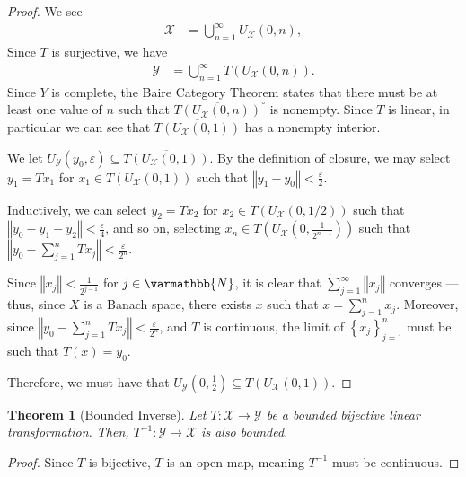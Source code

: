\documentclass[10pt]{extarticle}
\newcommand{\N}{\mathbb{N}}
\newcommand{\norm}[1]{\left\Vert #1\right\Vert}
\newcommand{\set}[1]{\left\{#1\right\}}
\newcommand{\ve}{\varepsilon}
\theoremstyle{plain}
\newtheorem*{theorem}{Theorem}
\theoremstyle{definition}
\theoremstyle{note}
\renewcommand*{\mathbb}[1]{\varmathbb{#1}}
\renewcommand{\newline}{\hfill\break}
\begin{document}
\begin{proof}
  We see
  \begin{align*}
    \mathcal{X} &= \bigcup_{n=1}^{\infty}U_{\mathcal{X}}(0,n),
  \end{align*}
  Since $T$ is surjective, we have
  \begin{align*}
    \mathcal{Y} &= \bigcup_{n=1}^{\infty}T\left(U_{\mathcal{X}}(0,n)\right).
  \end{align*}
  Since $Y$ is complete, the Baire Category Theorem states that there must be at least one value of $n$ such that $\overline{T\left(U_{\mathcal{X}}(0,n)\right)}^{\circ}$ is nonempty. Since $T$ is linear, in particular we can see that $\overline{T\left(U_{\mathcal{X}}(0,1)\right)}$ has a nonempty interior.\newline

  We let $U_{\mathcal{Y}}\left(y_0,\ve\right)\subseteq \overline{T\left(U_{\mathcal{X}}(0,1)\right)}$. By the definition of closure, we may select $y_1 = Tx_1$ for $x_1 \in T\left(U_{\mathcal{X}}(0,1)\right)$ such that $\norm{y_1 - y_0} < \frac{\ve}{2}$. \newline

  Inductively, we can select $y_2 = Tx_2$ for $x_2 \in T\left(U_{\mathcal{X}}(0,1/2)\right)$ such that $\norm{y_0 - y_1 - y_2} < \frac{\ve}{4}$, and so on, selecting $x_n\in T\left(U_{\mathcal{X}}\left(0,\frac{1}{2^{n-1}}\right)\right)$ such that $\norm{y_0 - \sum_{j=1}^{n}Tx_j} < \frac{\ve}{2^{n}}$.\newline

  Since $\norm{x_j} < \frac{1}{2^{j-1}}$ for $j\in \N$, it is clear that $\sum_{j=1}^{\infty}\norm{x_j}$ converges --- thus, since $X$ is a Banach space, there exists $x$ such that $x = \sum_{j=1}^{n}x_j$. Moreover, since $\norm{y_0 - \sum_{j=1}^{n}Tx_j} < \frac{\ve}{2^n}$, and $T$ is continuous, the limit of $\set{x_j}_{j=1}^{n}$ must be such that $T(x) = y_0$.\newline

  Therefore, we must have that $U_{\mathcal{Y}}\left(0,\frac{1}{2}\right)\subseteq T\left(U_{\mathcal{X}}\left(0,1\right)\right)$.
\end{proof}
\begin{theorem}[Bounded Inverse]
  Let $T: \mathcal{X}\rightarrow \mathcal{Y}$ be a bounded bijective linear transformation. Then, $T^{-1}:\mathcal{Y}\rightarrow \mathcal{X}$ is also bounded.
\end{theorem}
\begin{proof}
  Since $T$ is bijective, $T$ is an open map, meaning $T^{-1}$ must be continuous.
\end{proof}
\end{document}

